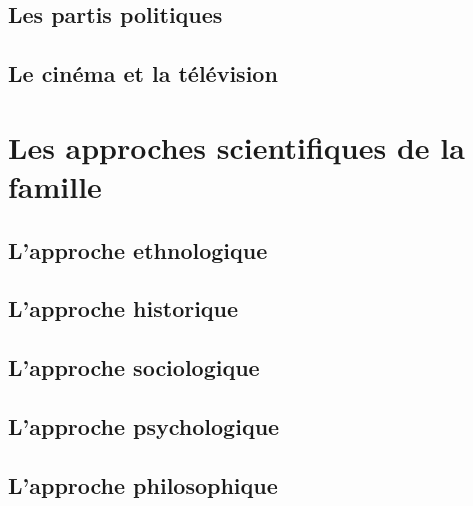 \documentclass[12pt, a4paper, openany]{book}
\begin{document}
\chapter{Les partis politiques}

\chapter{Le cinéma et la télévision}


\part{Les approches scientifiques de la famille}

\chapter{L'approche ethnologique}

\chapter{L'approche historique}

\chapter{L'approche sociologique}

\chapter{L'approche psychologique}

\chapter{L'approche philosophique}
\end{document}
